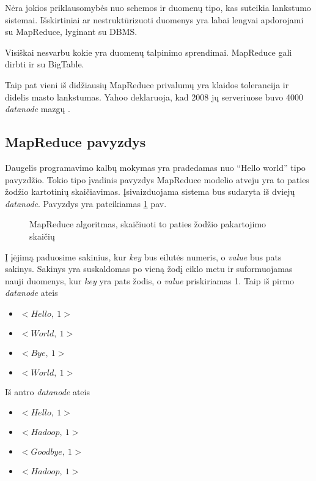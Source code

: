 \documentclass[10pt]{IEEEtran}
\begin{document}
		Nėra jokios priklausomybės nuo schemos ir duomenų tipo, kas suteikia lankstumo sistemai. Išskirtiniai ar nestruktūrizuoti duomenys yra labai lengvai apdorojami su MapReduce, lyginant su DBMS.

		Visiškai nesvarbu kokie yra duomenų talpinimo sprendimai. MapReduce gali dirbti ir su BigTable.

		Taip pat vieni iš didžiausių MapReduce privalumų yra klaidos tolerancija ir didelis masto lankstumas. Yahoo deklaruoja, kad 2008 jų serveriuose buvo 4000 \textit{datanode} mazgų \cite{shvachko2008scaling}.

	\subsection{MapReduce pavyzdys}

		Daugelis programavimo kalbų mokymas yra pradedamas nuo ``Hello world'' tipo pavyzdžio. Tokio tipo įvadinis pavyzdys MapReduce modelio atveju yra to paties žodžio kartotinių skaičiavimas. Įsivaizduojama sistema bus sudaryta iš dviejų \textit{datanode}. Pavyzdys yra pateikiamas \ref{lst:mapreduce} pav.

		\begin{figure}
			
			\caption{MapReduce algoritmas, skaičiuoti to paties žodžio pakartojimo skaičių}
			\label{lst:mapreduce}
		\end{figure}

		Į įėjimą paduosime sakinius, kur \textit{key} bus eilutės numeris, o \textit{value} bus pats sakinys. Sakinys yra suskaldomas po vieną žodį ciklo metu ir suformuojamas nauji duomenys, kur \textit{key} yra pats žodis, o \textit{value} priskiriamas 1. Taip iš pirmo \textit{datanode} ateis

		\begin{itemize}
			\item $<Hello,~1>$
			\item $<World,~1>$
			\item $<Bye,~1>$
			\item $<World,~1>$
		\end{itemize}

		Iš antro \textit{datanode} ateis

		\begin{itemize}
			\item $<Hello,~1>$
			\item $<Hadoop,~1>$
			\item $<Goodbye,~1>$
			\item $<Hadoop,~1>$
		\end{itemize}
\end{document}
